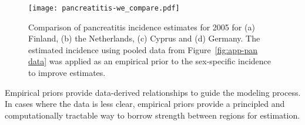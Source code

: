     \begin{figure}[h]
        \begin{center}
            \texttt{[image: pancreatitis-we\_compare.pdf]}
            \caption[Comparison of pancreatitis incidence estimates
              for 2005]{Comparison of pancreatitis incidence estimates
              for 2005 for (a) Finland, (b) the Netherlands, (c)
              Cyprus and (d) Germany.  The estimated incidence using
              pooled data from Figure~\ref{fig:app-pan data} was
              applied as an empirical prior to the sex-specific
              incidence to improve estimates.}
            \label{fig:app-pan compare}
        \end{center}
    \end{figure}

Empirical priors provide data-derived relationships to guide the
modeling process.  In cases where the data is less clear, empirical
priors provide a principled and computationally tractable way to
borrow strength between regions for estimation.
